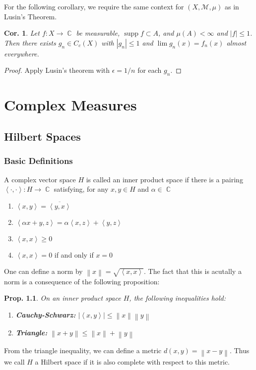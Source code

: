 \documentclass[12pt, a4paper]{book}
\DeclareMathOperator{\C}{\mathbb{C}}
\DeclareMathOperator{\supp}{supp}
\newcommand{\inner}[2]{\left\langle #1, #2 \right\rangle} %
\newcommand{\norm}[1]{\left\lVert#1\right\rVert} %
\newtheorem{corollary}[theorem]{Cor.}
\newtheorem{proposition}[theorem]{Prop.}
\theoremstyle{nonumberplain}
\newtheorem{proof}{Proof}
\begin{document}
For the following corollary, we require the same context for $(X,\mathcal{M},\mu)$ as in Lusin's Theorem.
\begin{corollary}
    Let $f:X\to\C$ be measurable, $\supp f\subset A$, and $\mu(A)<\infty$ and $|f|\leq 1$.
    Then there exists $g_n\in C_c(X)$ with $|g_n|\leq 1$ and $\lim g_n(x)=f_n(x)$ almost everywhere.
\end{corollary}
\begin{proof}
    Apply Lusin's theorem with $\epsilon=1/n$ for each $g_n$.
\end{proof}
\chapter{Complex Measures}
\section{Hilbert Spaces}
\subsection{Basic Definitions}
A complex vector space $H$ is called an inner product space if there is a pairing $\inner{\cdot}{\cdot}:H\to\C$ satisfying, for any $x,y\in H$ and $\alpha\in\C$
\begin{enumerate}[nolistsep]
    \item $\inner{x}{y}=\overline{\inner{y}{x}}$
    \item $\inner{\alpha x+y}{z}=\alpha\inner{x}{z}+\inner{y}{z}$
    \item $\inner{x}{x}\geq 0$
    \item $\inner{x}{x}=0$ if and only if $x=0$
\end{enumerate}
One can define a norm by $\norm{x}=\sqrt{\inner{x}{x}}$.
The fact that this is acutally a norm is a consequence of the following proposition:
\begin{proposition}
    On an inner product space $H$, the following inequalities hold:
    \begin{enumerate}[nolistsep]
        \item \textbf{Cauchy-Schwarz:} $|\inner{x}{y}|\leq\norm{x}\norm{y}$
        \item \textbf{Triangle:} $\norm{x+y}\leq\norm{x}+\norm{y}$
    \end{enumerate}
\end{proposition}
From the triangle inequality, we can define a metric $d(x,y)=\norm{x-y}$.
Thus we call $H$ a Hilbert space if it is also complete with respect to this metric.
\end{document}
